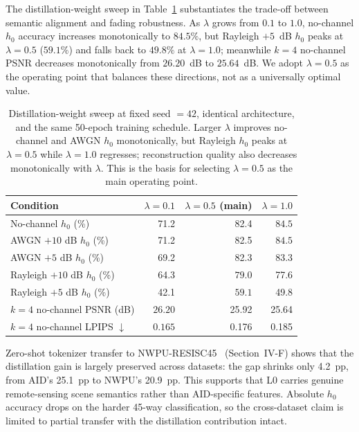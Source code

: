 \documentclass[lettersize,journal]{IEEEtran}
\begin{document}
The distillation-weight sweep in Table~\ref{tab:lambda_sweep} substantiates the trade-off between semantic alignment and fading robustness. As $\lambda$ grows from $0.1$ to $1.0$, no-channel $h_0$ accuracy increases monotonically to $84.5\%$, but Rayleigh $+5$~dB $h_0$ peaks at $\lambda=0.5$ ($59.1\%$) and falls back to $49.8\%$ at $\lambda=1.0$; meanwhile $k{=}4$ no-channel PSNR decreases monotonically from $26.20$~dB to $25.64$~dB. We adopt $\lambda=0.5$ as the operating point that balances these directions, not as a universally optimal value.

\begin{table}[!t]
\centering
\caption{Distillation-weight sweep at fixed seed $=42$, identical architecture, and the same 50-epoch training schedule. Larger $\lambda$ improves no-channel and AWGN $h_0$ monotonically, but Rayleigh $h_0$ peaks at $\lambda=0.5$ while $\lambda=1.0$ regresses; reconstruction quality also decreases monotonically with $\lambda$. This is the basis for selecting $\lambda=0.5$ as the main operating point.}
\label{tab:lambda_sweep}
\begin{tabular}{@{}lrrr@{}}
\toprule
Condition & $\lambda{=}0.1$ & $\lambda{=}0.5$ (main) & $\lambda{=}1.0$ \\
\midrule
No-channel $h_0$ (\%)            & 71.2 & 82.4 & $\mathbf{84.5}$ \\
AWGN $+10$ dB $h_0$ (\%)         & 71.2 & 82.5 & $\mathbf{84.5}$ \\
AWGN $+5$ dB $h_0$ (\%)          & 69.2 & 82.3 & $\mathbf{83.3}$ \\
Rayleigh $+10$ dB $h_0$ (\%)     & 64.3 & $\mathbf{79.0}$ & 77.6 \\
Rayleigh $+5$ dB $h_0$ (\%)      & 42.1 & $\mathbf{59.1}$ & 49.8 \\
$k{=}4$ no-channel PSNR (dB)     & $\mathbf{26.20}$ & 25.92 & 25.64 \\
$k{=}4$ no-channel LPIPS $\downarrow$ & $\mathbf{0.165}$ & 0.176 & 0.185 \\
\bottomrule
\end{tabular}
\end{table}

Zero-shot tokenizer transfer to NWPU-RESISC45~\cite{cheng2017nwpu} (Section~IV-F) shows that the distillation gain is largely preserved across datasets: the gap shrinks only 4.2~pp, from AID's 25.1~pp to NWPU's 20.9~pp. This supports that L0 carries genuine remote-sensing scene semantics rather than AID-specific features. Absolute $h_0$ accuracy drops on the harder 45-way classification, so the cross-dataset claim is limited to partial transfer with the distillation contribution intact.
\end{document}
